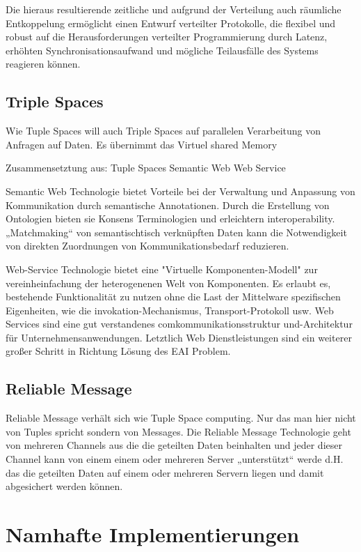 \documentclass[a4paper,12pt]{scrreprt}
\begin{document}
		Die hieraus resultierende zeitliche und aufgrund der Verteilung auch räumliche Entkoppelung ermöglicht einen Entwurf verteilter Protokolle, die flexibel und robust auf die Herausforderungen verteilter Programmierung durch Latenz, erhöhten Synchronisationsaufwand und mögliche Teilausfälle des Systems reagieren können.
		
		
		\section{Triple Spaces}
		
		Wie Tuple Spaces will auch Triple Spaces auf parallelen Verarbeitung von Anfragen auf Daten. Es übernimmt das Virtuel shared Memory 
		
		Zusammensetztung aus:
		Tuple Spaces
		Semantic Web
		Web Service
		
		
		Semantic Web Technologie bietet Vorteile bei der Verwaltung und Anpassung von Kommunikation durch semantische Annotationen. Durch die Erstellung von Ontologien bieten sie Konsens Terminologien und erleichtern interoperability. „Matchmaking“ von semantischtisch verknüpften Daten kann die Notwendigkeit von direkten Zuordnungen von Kommunikationsbedarf reduzieren.
		
		
		Web-Service Technologie bietet eine 
		"Virtuelle Komponenten-Modell" zur vereinheinfachung der 
		heterogenenen Welt von Komponenten. Es  erlaubt es, bestehende Funktionalität zu nutzen 
		ohne die Last der Mittelware spezifischen Eigenheiten, wie die invokation-Mechanismus, Transport-Protokoll usw. Web Services sind eine gut verstandenes comkommunikationsstruktur und-Architektur für Unternehmensanwendungen. Letztlich Web 
		Dienstleistungen sind ein weiterer großer Schritt in Richtung 
		Lösung des EAI Problem.
		
		\section{Reliable Message}
			
			Reliable Message verhält sich wie Tuple Space computing. Nur das man hier nicht von Tuples spricht sondern von Messages.  Die Reliable Message Technologie geht von mehreren Channels aus die die geteilten Daten beinhalten und jeder dieser Channel kann von einem einem oder mehreren Server „unterstützt“ werde d.H.  das die geteilten Daten auf einem oder mehreren Servern liegen und damit abgesichert werden können. 
			
	
\chapter{Namhafte Implementierungen}
\end{document}
